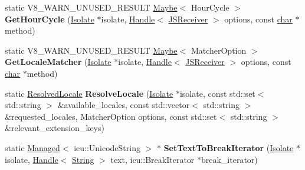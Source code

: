\begin{DoxyCompactItemize}
\mbox{\label{classv8_1_1internal_1_1Intl_a08340a8fa79c6d6fb25be569c3e4ae73}} 
static V8\+\_\+\+W\+A\+R\+N\+\_\+\+U\+N\+U\+S\+E\+D\+\_\+\+R\+E\+S\+U\+LT \mbox{\hyperlink{classv8_1_1Maybe}{Maybe}}$<$ Hour\+Cycle $>$ {\bfseries Get\+Hour\+Cycle} (\mbox{\hyperlink{classv8_1_1internal_1_1Isolate}{Isolate}} $\ast$isolate, \mbox{\hyperlink{classv8_1_1internal_1_1Handle}{Handle}}$<$ \mbox{\hyperlink{classv8_1_1internal_1_1JSReceiver}{J\+S\+Receiver}} $>$ options, const \mbox{\hyperlink{classchar}{char}} $\ast$method)
\item 
\mbox{\label{classv8_1_1internal_1_1Intl_afd729cbef02a1196fa408830985b854c}} 
static V8\+\_\+\+W\+A\+R\+N\+\_\+\+U\+N\+U\+S\+E\+D\+\_\+\+R\+E\+S\+U\+LT \mbox{\hyperlink{classv8_1_1Maybe}{Maybe}}$<$ Matcher\+Option $>$ {\bfseries Get\+Locale\+Matcher} (\mbox{\hyperlink{classv8_1_1internal_1_1Isolate}{Isolate}} $\ast$isolate, \mbox{\hyperlink{classv8_1_1internal_1_1Handle}{Handle}}$<$ \mbox{\hyperlink{classv8_1_1internal_1_1JSReceiver}{J\+S\+Receiver}} $>$ options, const \mbox{\hyperlink{classchar}{char}} $\ast$method)
\item 
\mbox{\label{classv8_1_1internal_1_1Intl_a1c4486a55d23b775303ec174b0d9c505}} 
static \mbox{\hyperlink{structv8_1_1internal_1_1Intl_1_1ResolvedLocale}{Resolved\+Locale}} {\bfseries Resolve\+Locale} (\mbox{\hyperlink{classv8_1_1internal_1_1Isolate}{Isolate}} $\ast$isolate, const std\+::set$<$ std\+::string $>$ \&available\+\_\+locales, const std\+::vector$<$ std\+::string $>$ \&requested\+\_\+locales, Matcher\+Option options, const std\+::set$<$ std\+::string $>$ \&relevant\+\_\+extension\+\_\+keys)
\item 
\mbox{\label{classv8_1_1internal_1_1Intl_a2f83c3d04aeefc617f04af64272cf3f1}} 
static \mbox{\hyperlink{classv8_1_1internal_1_1Managed}{Managed}}$<$ icu\+::\+Unicode\+String $>$ $\ast$ {\bfseries Set\+Text\+To\+Break\+Iterator} (\mbox{\hyperlink{classv8_1_1internal_1_1Isolate}{Isolate}} $\ast$isolate, \mbox{\hyperlink{classv8_1_1internal_1_1Handle}{Handle}}$<$ \mbox{\hyperlink{classv8_1_1internal_1_1String}{String}} $>$ text, icu\+::\+Break\+Iterator $\ast$break\+\_\+iterator)
\item 
\mbox{\label{classv8_1_1internal_1_1Intl_ae89a6e8f1b19c80f424e4b0bdddff17d}} 

\end{DoxyCompactItemize}
